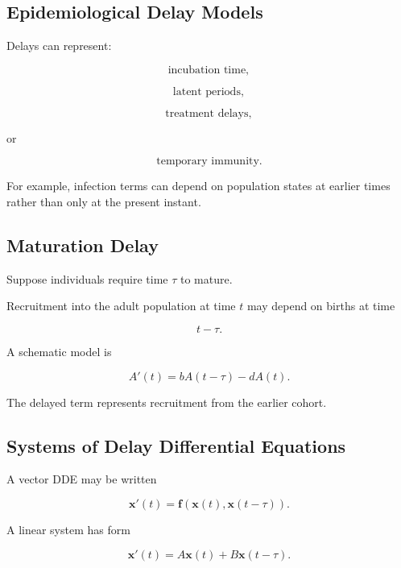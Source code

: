 \subsection{Epidemiological Delay Models}
\label{subsec:epidemiological-delay-models}

Delays can represent:

\[
\boxed{
\text{incubation time},
}
\]

\[
\boxed{
\text{latent periods},
}
\]

\[
\boxed{
\text{treatment delays},
}
\]

or

\[
\boxed{
\text{temporary immunity}.
}
\]

For example, infection terms can depend on population states at earlier
times rather than only at the present instant.

\subsection{Maturation Delay}
\label{subsec:maturation-delay}

Suppose individuals require time \(\tau\) to mature.

Recruitment into the adult population at time \(t\) may depend on births
at time

\[
t-\tau.
\]

A schematic model is

\[
\boxed{
A'(t)
=
bA(t-\tau)
-
dA(t).
}
\]

The delayed term represents recruitment from the earlier cohort.

\subsection{Systems of Delay Differential Equations}
\label{subsec:systems-of-ddes}

A vector DDE may be written

\[
\boxed{
\mathbf{x}'(t)
=
\mathbf{f}
\left(
\mathbf{x}(t),
\mathbf{x}(t-\tau)
\right).
}
\]

A linear system has form

\[
\boxed{
\mathbf{x}'(t)
=
A\mathbf{x}(t)
+
B\mathbf{x}(t-\tau).
}
\]


